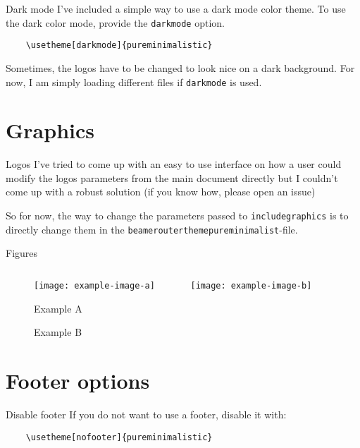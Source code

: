 \documentclass[aspectratio=169]{beamer}
\begin{document}
\begin{frame}[fragile]{Dark mode}
  I've included a simple way to use a dark mode
  color theme. To use the dark color mode, provide the \texttt{darkmode}
  option.
  \begin{verbatim}
    \usetheme[darkmode]{pureminimalistic}
    \end{verbatim}
  Sometimes, the logos have to be changed to look nice on a
  dark background. For now, I am simply loading different
  files if \texttt{darkmode} is used.
\end{frame}

\section{Graphics}
\begin{frame}[fragile]{Logos}
  I've tried to come up with an easy to use interface on how
  a user could modify the logos parameters
  from the main document directly
  but I couldn't come up with a robust solution (if you know
  how, please open an issue)

  So for now, the way to change the parameters passed
  to \texttt{includegraphics} is to directly change them
  in the \texttt{beamerouterthemepureminimalist}-file.
\end{frame}

\begin{frame}{Figures}
    \begin{figure}[H]
        \centering
        \begin{columns}[T]
            \begin{column}{.4\linewidth}
                \texttt{[image: example-image-a]}
                \caption{Example A}
            \end{column}
            \begin{column}{.4\linewidth}
                \texttt{[image: example-image-b]}
                \caption{Example B}
            \end{column}
        \end{columns}
    \end{figure}
\end{frame}


\section{Footer options}
\begin{frame}[fragile]{Disable footer}
  If you do not want to use a footer, disable it with:
  \begin{verbatim}
    \usetheme[nofooter]{pureminimalistic}
  \end{verbatim}
\end{frame}
\end{document}
